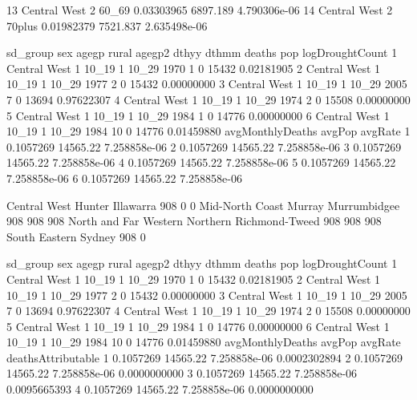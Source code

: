 \documentclass[a4paper]{article}                %
\begin{document}
\begin{Schunk}
\begin{Soutput}
13 Central West   2  60_69       0.03303965  6897.189 4.790306e-06
14 Central West   2 70plus       0.01982379  7521.837 2.635498e-06
\end{Soutput}
\begin{Soutput}
      sd_group sex agegp rural agegp2 dthyy dthmm deaths   pop logDroughtCount
1 Central West   1 10_19     1  10_29  1970     1      0 15432      0.02181905
2 Central West   1 10_19     1  10_29  1977     2      0 15432      0.00000000
3 Central West   1 10_19     1  10_29  2005     7      0 13694      0.97622307
4 Central West   1 10_19     1  10_29  1974     2      0 15508      0.00000000
5 Central West   1 10_19     1  10_29  1984     1      0 14776      0.00000000
6 Central West   1 10_19     1  10_29  1984    10      0 14776      0.01459880
  avgMonthlyDeaths   avgPop      avgRate
1        0.1057269 14565.22 7.258858e-06
2        0.1057269 14565.22 7.258858e-06
3        0.1057269 14565.22 7.258858e-06
4        0.1057269 14565.22 7.258858e-06
5        0.1057269 14565.22 7.258858e-06
6        0.1057269 14565.22 7.258858e-06
\end{Soutput}
\begin{Soutput}
         Central West                Hunter             Illawarra 
                  908                     0                     0 
      Mid-North Coast                Murray          Murrumbidgee 
                  908                   908                   908 
North and Far Western              Northern        Richmond-Tweed 
                  908                   908                   908 
        South Eastern                Sydney 
                  908                     0 
\end{Soutput}
\begin{Soutput}
      sd_group sex agegp rural agegp2 dthyy dthmm deaths   pop logDroughtCount
1 Central West   1 10_19     1  10_29  1970     1      0 15432      0.02181905
2 Central West   1 10_19     1  10_29  1977     2      0 15432      0.00000000
3 Central West   1 10_19     1  10_29  2005     7      0 13694      0.97622307
4 Central West   1 10_19     1  10_29  1974     2      0 15508      0.00000000
5 Central West   1 10_19     1  10_29  1984     1      0 14776      0.00000000
6 Central West   1 10_19     1  10_29  1984    10      0 14776      0.01459880
  avgMonthlyDeaths   avgPop      avgRate deathsAttributable
1        0.1057269 14565.22 7.258858e-06       0.0002302894
2        0.1057269 14565.22 7.258858e-06       0.0000000000
3        0.1057269 14565.22 7.258858e-06       0.0095665393
4        0.1057269 14565.22 7.258858e-06       0.0000000000

\end{Soutput}
\end{Schunk}
\end{document}
